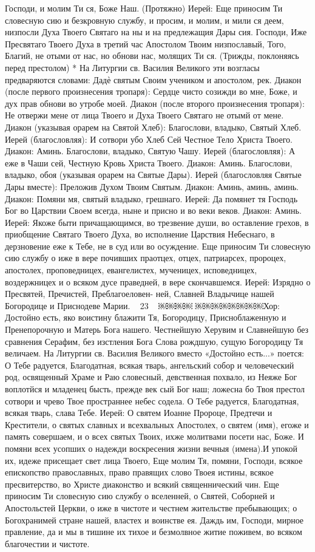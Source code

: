 Господи, и молим Ти ся, Боже Наш. (Протяжно)
Иерей: Еще приносим Ти словесную сию и безкровную службу, и просим, и молим, и мили ся деем, низпосли Духа Твоего Святаго на ны и на предлежащия Дары сия. Господи, Иже Пресвятаго Твоего Духа в третий час Апостолом Твоим низпославый, Того, Благий, не отыми от нас, но обнови нас, молящих Ти ся. (Трижды, поклоняясь перед престолом)
* На Литургии св. Василия Великого эти возгласы предваряются словами:
Дадѐ святым Своим учеником и апостолом, рек.
Диакон (после первого произнесения тропаря): Сердце чисто созижди во мне, Боже, и дух прав обнови во утробе моей.
Диакон (после второго произнесения тропаря): Не отвержи мене от лица Твоего и Духа Твоего Святаго не отымй от мене.
Диакон (указывая орарем на Святой Хлеб): Благослови, владыко, Святый Хлеб.
Иерей (благословляя): И сотвори убо Хлеб Сей Честное Тело Христа Твоего.
Диакон: Аминь. Благослови, владыко, Святую Чашу.
Иерей (благословляя): А еже в Чаши сей, Честную Кровь Христа Твоего.
Диакон: Аминь. Благослови, владыко, обоя (указывая орарем на Святые Дары).
Иерей (благословляя Святые Дары вместе): Преложив Духом Твоим Святым.
Диакон: Аминь, аминь, аминь.
Диакон: Помяни мя, святый владыко, грешнаго.
Иерей: Да помянет тя Господь Бог во Царствии Своем всегда, ныне и присно и во веки веков.
Диакон: Аминь.
Иерей: Якоже быти причащающимся, во трезвение души, во оставление грехов, в приобщение Святаго Твоего Духа, во исполнение Царствия Небеснаго, в дерзновение еже к Тебе, не в суд или во осуждение. Еще приносим Ти словесную сию службу о иже в вере почивших праотцех, отцех, патриарсех, пророцех, апостолех, проповедницех, евангелистех, мученицех, исповедницех, воздержницех и о всяком дусе праведней, в вере скончавшемся.
Иерей: Изрядно о Пресвятей, Пречистей, Преблагоеловен- ней, Славней Владычице нашей Богородице и Приснодеве Марии.
~ 23 ~
￼￼￼￼
￼￼￼￼￼￼￼￼Хор: Достойно есть, яко воистину блажити Тя, Богородицу, Присноблаженную и Пренепорочную и Матерь Бога нашего. Честнейшую Херувим и Славнейшую без сравнения Серафим, без изстления Бога Слова рождшую, сущую Богородицу Тя величаем.
На Литургии св. Василия Великого вместо «Достойно есть...» поется:
О Тебе радуется, Благодатная, всякая тварь, ангельский собор и человеческий род, освященный Храме и Раю словесный, девственная похвало, из Неяже Бог воплотйся и младенец бысть, прежде век сый Бог наш; ложесна бо Твоя престол сотвори и чрево Твое пространнее небес содела. О Тебе радуется, Благодатная, всякая тварь, слава Тебе.
Иерей: О святем Иоанне Пророце, Предтечи и Крестители, о святых славных и всехвальных Апостолех, о святем (имя), егоже и память совершаем, и о всех святых Твоих, ихже молитвами посети нас, Боже. И помяни всех усопших о надежди воскресения жизни вечныя (имена).И упокой их, идеже присещает свет лица Твоего, Еще молим Тя, помяни, Господи, всякое епископство православных, право правящих слово Твоея истины, всякое пресвитерство, во Христе диаконство и всякий священнический чин. Еще приносим Ти словесную сию службу о вселенней, о Святей, Соборней и Апостольстей Церкви, о иже в чистоте и честнем жительстве пребывающих; о Богохранимей стране нашей, властех и воинстве ея. Даждь им, Господи, мирное правление, да и мы в тишине их тихое и безмолвное житие поживем, во всяком благочестии и чистоте.
